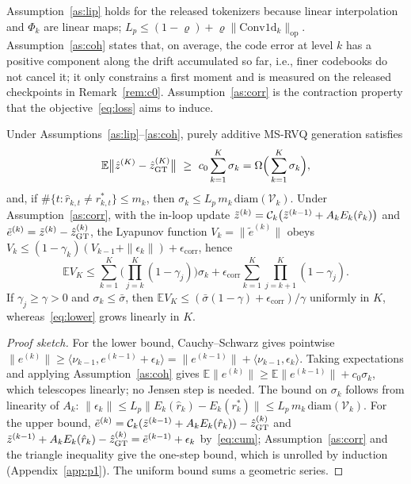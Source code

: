 Assumption~\ref{as:lip} holds for the released tokenizers because linear interpolation and $\Phi_k$ are linear maps; $L_p\le(1-\varrho)+\varrho\|\mathrm{Conv1d}_k\|_{\mathrm{op}}$. Assumption~\ref{as:coh} states that, on average, the code error at level $k$ has a positive component along the drift accumulated so far, i.e., finer codebooks do not cancel it; it only constrains a first moment and is measured on the released checkpoints in Remark~\ref{rem:c0}. Assumption~\ref{as:corr} is the contraction property that the objective~\eqref{eq:loss} aims to induce.

\begin{proposition}\label{prop:contraction}
Under Assumptions~\ref{as:lip}--\ref{as:coh}, purely additive MS-RVQ generation satisfies
\begin{equation}
\mathbb{E}\big\|\zh^{(K)}-\zh^{(K)}_{\mathrm{GT}}\big\|\ \ge\ c_0\sum_{k=1}^{K}\sigma_k=\Omega\Big(\sum_{k=1}^{K}\sigma_k\Big), \label{eq:lower}
\end{equation}
and, if $\#\{t:\hat r_{k,t}\neq r^\ast_{k,t}\}\le m_k$, then $\sigma_k\le L_p\,m_k\,\mathrm{diam}(\mathcal{V}_k)$. Under Assumption~\ref{as:corr}, with the in-loop update $\tilde{z}^{(k)}=\mathcal{C}_k\big(\tilde{z}^{(k-1)}+A_kE_k(\hat r_k)\big)$ and $\tilde e^{(k)}=\tilde{z}^{(k)}-\hat{z}^{(k)}_{\mathrm{GT}}$, the Lyapunov function $V_k=\|\tilde e^{(k)}\|$ obeys $V_k\le(1-\gamma_k)(V_{k-1}+\|\epsilon_k\|)+\epsilon_{\mathrm{corr}}$, hence
\begin{equation}
\mathbb{E}V_K\le\sum_{k=1}^{K}\Big(\prod_{j=k}^{K}(1-\gamma_j)\Big)\sigma_k+\epsilon_{\mathrm{corr}}\sum_{k=1}^{K}\prod_{j=k+1}^{K}(1-\gamma_j). \label{eq:upper}
\end{equation}
If $\gamma_j\ge\gamma>0$ and $\sigma_k\le\bar\sigma$, then $\mathbb{E}V_K\le(\bar\sigma(1-\gamma)+\epsilon_{\mathrm{corr}})/\gamma$ uniformly in $K$, whereas~\eqref{eq:lower} grows linearly in $K$.
\end{proposition}
\begin{proof}[Proof sketch]
For the lower bound, Cauchy--Schwarz gives pointwise $\|e^{(k)}\|\ge\langle \nu_{k-1},e^{(k-1)}+\epsilon_k\rangle=\|e^{(k-1)}\|+\langle \nu_{k-1},\epsilon_k\rangle$. Taking expectations and applying Assumption~\ref{as:coh} gives $\mathbb{E}\|e^{(k)}\|\ge\mathbb{E}\|e^{(k-1)}\|+c_0\sigma_k$, which telescopes linearly; no Jensen step is needed. The bound on $\sigma_k$ follows from linearity of $A_k$: $\|\epsilon_k\|\le L_p\|E_k(\hat r_k)-E_k(r_k^\ast)\|\le L_p\,m_k\,\mathrm{diam}(\mathcal{V}_k)$. For the upper bound, $\tilde e^{(k)}=\mathcal{C}_k(\tilde{z}^{(k-1)}+A_kE_k(\hat r_k))-\hat{z}^{(k)}_{\mathrm{GT}}$ and $\tilde{z}^{(k-1)}+A_kE_k(\hat r_k)-\hat{z}^{(k)}_{\mathrm{GT}}=\tilde e^{(k-1)}+\epsilon_k$ by~\eqref{eq:cum}; Assumption~\ref{as:corr} and the triangle inequality give the one-step bound, which is unrolled by induction (Appendix~\ref{app:p1}). The uniform bound sums a geometric series.
\end{proof}

